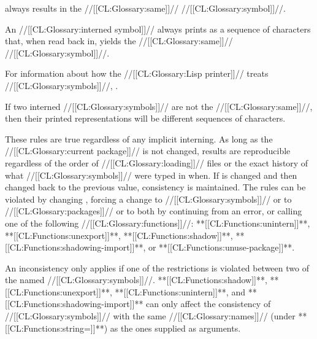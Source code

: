 always results in the //[[CL:Glossary:same]]// //[[CL:Glossary:symbol]]//.




An //[[CL:Glossary:interned symbol]]// always prints as a sequence of characters that, 
when read back in, yields the //[[CL:Glossary:same]]// //[[CL:Glossary:symbol]]//.

For information about how the //[[CL:Glossary:Lisp printer]]// treats //[[CL:Glossary:symbols]]//,
\seesection\PrintingSymbols.




If two interned //[[CL:Glossary:symbols]]// are not the //[[CL:Glossary:same]]//,
then their printed representations will be different sequences of characters.
\endlist


These rules are true regardless of any implicit interning.
As long as the //[[CL:Glossary:current package]]// is not changed,
results are reproducible regardless of the order of //[[CL:Glossary:loading]]// files 
or the exact history of what //[[CL:Glossary:symbols]]// were typed in when.  
If  is changed and then changed back to the previous value,
consistency is maintained.
The rules can be violated by
    changing ,
    forcing a change to //[[CL:Glossary:symbols]]// 
                  or to //[[CL:Glossary:packages]]// 
    	          or to both
    by continuing from an error,
or calling one of the following //[[CL:Glossary:functions]]//:
    **[[CL:Functions:unintern]]**,
    **[[CL:Functions:unexport]]**,
    **[[CL:Functions:shadow]]**,
    **[[CL:Functions:shadowing-import]]**,
 or **[[CL:Functions:unuse-package]]**.

An inconsistency only applies if one of the restrictions is violated
between two of the named //[[CL:Glossary:symbols]]//.
**[[CL:Functions:shadow]]**, **[[CL:Functions:unexport]]**, **[[CL:Functions:unintern]]**,
and **[[CL:Functions:shadowing-import]]** can only affect the consistency of
//[[CL:Glossary:symbols]]// with the same //[[CL:Glossary:names]]// (under **[[CL:Functions:string=]]**)
as the ones supplied as arguments.

\endsubsection%

